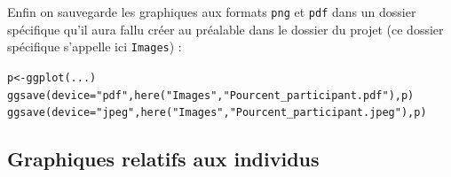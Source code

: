 \documentclass[11pt]{article}\usepackage[]{graphicx}\usepackage[]{color}
\makeatletter
\newcommand{\hlstr}[1]{\textcolor[rgb]{0.063,0.58,0.627}{#1}}%
\newcommand{\hlstd}[1]{\textcolor[rgb]{0.196,0.196,0.196}{#1}}%
\newcommand{\hlkwb}[1]{\textcolor[rgb]{0.627,0,0.314}{#1}}%
\newcommand{\hlkwc}[1]{\textcolor[rgb]{0,0.631,0.314}{#1}}%
\newcommand{\hlkwd}[1]{\textcolor[rgb]{0.78,0.227,0.412}{#1}}%
\newenvironment{kframe}{%
 \def\at@end@of@kframe{}%
 \ifinner\ifhmode%
  \def\at@end@of@kframe{\end{minipage}}%
  \begin{minipage}{\columnwidth}%
 \fi\fi%
 \def\FrameCommand##1{\hskip\@totalleftmargin \hskip-\fboxsep
 \colorbox{shadecolor}{##1}\hskip-\fboxsep
     \hskip-\linewidth \hskip-\@totalleftmargin \hskip\columnwidth}%
 \MakeFramed {\advance\hsize-\width
   \@totalleftmargin\z@ \linewidth\hsize
   \@setminipage}}%
 {\par\unskip\endMakeFramed%
 \at@end@of@kframe}
\newenvironment{knitrout}{}{} %
\newcommand{\type}[1]{\textcolor{RedOrange}{\texttt{#1}}}
\makeatother
\begin{document}
Enfin on sauvegarde les graphiques aux formats \type{png} et \type{pdf} dans un dossier spécifique qu'il aura fallu créer au préalable dans le dossier du projet (ce dossier spécifique s'appelle ici \type{Images}) :
\begin{knitrout}\footnotesize
{}\color{fgcolor}\begin{kframe}
\begin{alltt}
\hlstd{p} \hlkwb{<-} \hlkwd{ggplot}\hlstd{(...)}
\hlkwd{ggsave}\hlstd{(}\hlkwc{device}\hlstd{=}\hlstr{"pdf"}\hlstd{,} \hlkwd{here}\hlstd{(}\hlstr{"Images"}\hlstd{,}\hlstr{"Pourcent_participant.pdf"}\hlstd{),p)}
\hlkwd{ggsave}\hlstd{(}\hlkwc{device}\hlstd{=}\hlstr{"jpeg"}\hlstd{,} \hlkwd{here}\hlstd{(}\hlstr{"Images"}\hlstd{,}\hlstr{"Pourcent_participant.jpeg"}\hlstd{),p)}
\end{alltt}
\end{kframe}
\end{knitrout}


\subsection{Graphiques relatifs aux individus}
\end{document}
